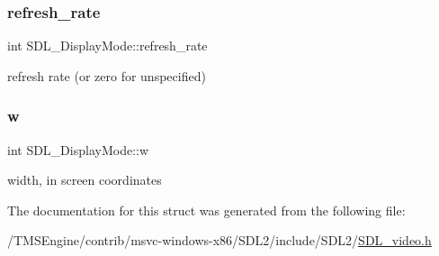 \subsubsection{\texorpdfstring{refresh\+\_\+rate}{refresh\_rate}}
{\footnotesize\ttfamily int S\+D\+L\+\_\+\+Display\+Mode\+::refresh\+\_\+rate}

refresh rate (or zero for unspecified) \mbox{\label{struct_s_d_l___display_mode_a504bb5e21950b719a0df43be51199046}} 
\subsubsection{\texorpdfstring{w}{w}}
{\footnotesize\ttfamily int S\+D\+L\+\_\+\+Display\+Mode\+::w}

width, in screen coordinates 

The documentation for this struct was generated from the following file\+:\begin{DoxyCompactItemize}
\item 
/\+T\+M\+S\+Engine/contrib/msvc-\/windows-\/x86/\+S\+D\+L2/include/\+S\+D\+L2/\hyperlink{_s_d_l__video_8h}{S\+D\+L\+\_\+video.\+h}\end{DoxyCompactItemize}
